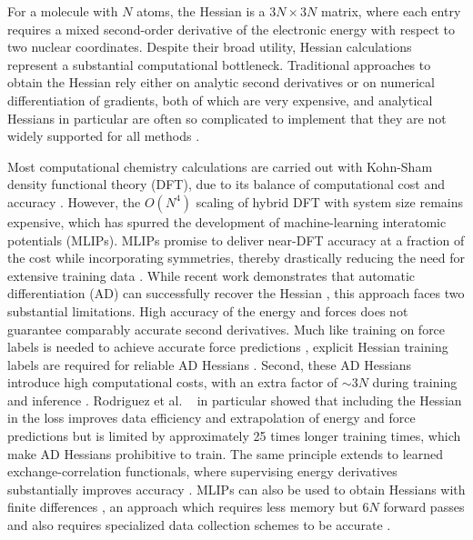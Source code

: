 \documentclass[pdflatex,sn-mathphys-num]{sn-jnl}%
\begin{document}
For a molecule with $N$ atoms, the Hessian is a $3N \times 3N$ matrix, where each entry requires a mixed second-order derivative of the electronic energy with respect to two nuclear coordinates. Despite their broad utility, Hessian calculations represent a substantial computational bottleneck.
Traditional approaches to obtain the Hessian rely either on analytic second derivatives or on numerical differentiation of gradients, both of which are very expensive, and analytical Hessians in particular are often so complicated to implement that they are not widely supported for all methods \citep{jorgensen1983,handy1984,komornicki1993}.

Most computational chemistry calculations are carried out with Kohn-Sham density functional theory \citep{kohn1965} (DFT), due to its balance of computational cost and accuracy \citep{bursch2022}.
However, the $O(N^4)$ scaling of hybrid DFT with system size remains expensive, which has spurred the development of machine-learning interatomic potentials (MLIPs). MLIPs promise to deliver near-DFT accuracy at a fraction of the cost while incorporating symmetries, thereby drastically reducing the need for extensive training data \citep{schutt2018,thomas2018,gasteiger2021,schutt2021,batatia2022,batzner2022}.
While recent work demonstrates that automatic differentiation (AD) can successfully recover the Hessian \citep{yang2024, yuan2024, gonnheimer2025, rodriguez2025, williams2025, cui2025horm}, this approach faces two substantial limitations. High accuracy of the energy and forces does not guarantee comparably accurate second derivatives. Much like training on force labels is needed to achieve accurate force predictions \cite{christensen2020forces}, explicit Hessian training labels are required for reliable AD Hessians \citep{zhao2025, cui2025horm}. 
Second, these AD Hessians introduce high computational costs, with an extra factor of $\sim{}3N$ during training and inference \citep{yuan2024,gonnheimer2025,rodriguez2025,williams2025,cui2025horm}. 
Rodriguez et al. ~\cite{rodriguez2025} in particular showed that including the Hessian in the loss improves data efficiency and extrapolation of energy and force predictions but is limited by approximately 25 times longer training times, which make AD Hessians prohibitive to train. The same principle extends to learned exchange-correlation functionals, where supervising energy derivatives substantially improves accuracy \citep{eberhard2026derivative}.
MLIPs can also be used to obtain Hessians with finite differences \citep{gonnheimer2025, fu2025}, an approach which requires less memory but $6N$ forward passes and also requires specialized data collection schemes to be accurate \cite{wander2025accessing}.\\
\end{document}
